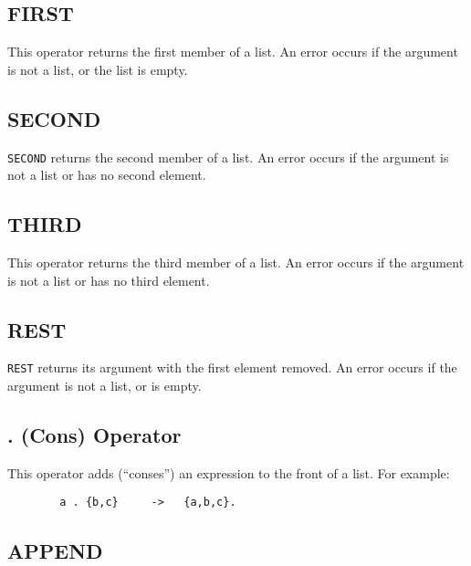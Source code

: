 \subsection{FIRST}
\hypertarget{operator:FIRST}{}

This operator returns the first member of a list.  An error
occurs if the argument is not a list, or the list is empty.

\subsection{SECOND}
\hypertarget{operator:SECOND}{}

\texttt{SECOND} returns the second member of a list.  An error
occurs if the argument is not a list or has no second element.

\subsection{THIRD}
\hypertarget{operator:THIRD}{}

This operator returns the third member of a list.  An error
occurs if the argument is not a list or has no third element.

\subsection{REST}
\hypertarget{operator:REST}{}

\texttt{REST} returns its argument with the first element
removed.  An error occurs if the argument is not a list, or is empty.

\subsection{\textbf{.} (Cons) Operator}
\hypertarget{operator:CONS}{}
\hypertarget{reserved:consop}{}

This operator adds (``conses'') an expression to the
front of a list.  For example:
\begin{verbatim}
        a . {b,c}     ->   {a,b,c}.
\end{verbatim}

\subsection{APPEND}
\hypertarget{operator:APPEND}{}

